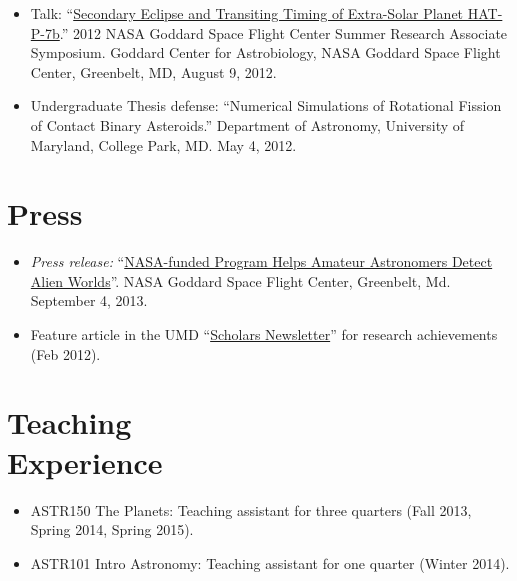 \documentclass[margin]{res}
\begin{document}
\begin{resume}
\begin{itemize}
\item Talk: ``\href{https://astrobiology.nasa.gov/seminars/featured-seminar-channels/gsfc-summer-internship/2012/08/09/gsfc-summer-research-associate-presentations/}{Secondary Eclipse and Transiting Timing of Extra-Solar Planet HAT-P-7b}.'' 2012 NASA Goddard Space Flight Center Summer Research Associate Symposium. Goddard Center for Astrobiology, NASA Goddard Space Flight Center, Greenbelt, MD, August 9, 2012.

\item Undergraduate Thesis defense:  ``Numerical Simulations of Rotational Fission of Contact Binary Asteroids.'' Department of Astronomy, University of Maryland, College Park, MD. May 4, 2012.\\
\end{itemize}



\section{Press} 
\begin{itemize}
\item {\it Press release:} ``\href{http://www.nasa.gov/content/nasa-funded-program-helps-amateur-astronomers-detect-alien-worlds/}{NASA-funded Program Helps Amateur Astronomers Detect Alien Worlds}''. NASA Goddard Space Flight Center, Greenbelt, Md. September 4, 2013.

\item Feature article in the UMD ``\href{http://www.scholars.umd.edu/news/newsletter/363-february-2012-issue-1}{Scholars Newsletter}'' for research achievements (Feb 2012).\\
\end{itemize}              


\section{Teaching \\Experience}
\begin{itemize}   
\item ASTR150 The Planets: Teaching assistant for three quarters (Fall 2013, Spring 2014, Spring 2015).

\item ASTR101 Intro Astronomy: Teaching assistant for one quarter (Winter 2014). \\
\end{itemize}


\end{resume}
\end{document}
